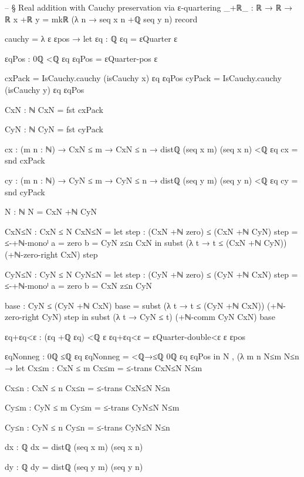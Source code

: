 \documentclass[11pt,a4paper]{book}
\begin{document}
\begin{code}
-- § Real addition with Cauchy preservation via ε-quartering
_+ℝ_ : ℝ → ℝ → ℝ
x +ℝ y = mkℝ (λ n → seq x n +ℚ seq y n) record
  { cauchy = λ ε εpos →
      let
        εq : ℚ
        εq = εQuarter ε

        εqPos : 0ℚ <ℚ εq
        εqPos = εQuarter-pos ε

        cxPack = IsCauchy.cauchy (isCauchy x) εq εqPos
        cyPack = IsCauchy.cauchy (isCauchy y) εq εqPos

        CxN : ℕ
        CxN = fst cxPack

        CyN : ℕ
        CyN = fst cyPack

        cx : (m n : ℕ) → CxN ≤ m → CxN ≤ n → distℚ (seq x m) (seq x n) <ℚ εq
        cx = snd cxPack

        cy : (m n : ℕ) → CyN ≤ m → CyN ≤ n → distℚ (seq y m) (seq y n) <ℚ εq
        cy = snd cyPack

        N : ℕ
        N = CxN +ℕ CyN

        CxN≤N : CxN ≤ N
        CxN≤N =
          let
            step : (CxN +ℕ zero) ≤ (CxN +ℕ CyN)
            step = ≤-+ℕ-monoˡ {a = zero} {b = CyN} z≤n CxN
          in
          subst (λ t → t ≤ (CxN +ℕ CyN)) (+ℕ-zero-right CxN) step

        CyN≤N : CyN ≤ N
        CyN≤N =
          let
            step : (CyN +ℕ zero) ≤ (CyN +ℕ CxN)
            step = ≤-+ℕ-monoˡ {a = zero} {b = CxN} z≤n CyN

            base : CyN ≤ (CyN +ℕ CxN)
            base = subst (λ t → t ≤ (CyN +ℕ CxN)) (+ℕ-zero-right CyN) step
          in
          subst (λ t → CyN ≤ t) (+ℕ-comm CyN CxN) base

        εq+εq<ε : (εq +ℚ εq) <ℚ ε
        εq+εq<ε = εQuarter-double<ε ε εpos

        εqNonneg : 0ℚ ≤ℚ εq
        εqNonneg = <ℚ→≤ℚ {0ℚ} {εq} εqPos
      in
      N , (λ m n N≤m N≤n →
        let
          Cx≤m : CxN ≤ m
          Cx≤m = ≤-trans CxN≤N N≤m

          Cx≤n : CxN ≤ n
          Cx≤n = ≤-trans CxN≤N N≤n

          Cy≤m : CyN ≤ m
          Cy≤m = ≤-trans CyN≤N N≤m

          Cy≤n : CyN ≤ n
          Cy≤n = ≤-trans CyN≤N N≤n

          dx : ℚ
          dx = distℚ (seq x m) (seq x n)

          dy : ℚ
          dy = distℚ (seq y m) (seq y n)

}
\end{code}
\end{document}
